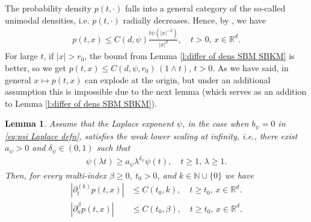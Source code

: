 \documentclass[reqno]{amsart}
\newtheorem{lemma}[theorem]{Lemma}
\theoremstyle{remark}
\numberwithin{equation}{section} %
\newcommand{\1}{\mathds{1}}
\begin{document}
	The probability density $p(t,\cdot)$ falls into a general category of the so-called unimodal densities, i.e. $p(t,\cdot)$ radially decreases. Hence, by \cite[Corollary 7]{bogdan_density_and_tails_unimodal}, we have
	\begin{align}\label{eq:upper bound density p}
		p(t,x)\le C(d,\psi) \frac{t \psi(|x|^{-2})}{|x|^d},\quad t>0,\, x\in \mathbb{R}^d.
	\end{align}
	For large $t$, if $|x|>r_0$, the bound from Lemma \ref{l:differ of dens SBM SBKM} is better, so we get $p(t,x)\le C(d,\psi,r_0)\, (1\wedge t)$, $t>0$.
	As we have said, in general $x\mapsto p(t,x)$ can explode at the origin, but under an additional assumption this is impossible due to the next lemma (which serves as an addition to Lemma \ref{l:differ of dens SBM SBKM}).
	\begin{lemma}\label{l:density in origin}
		Assume that the Laplace exponent  $\psi$, in the case when $b_\psi=0$ in \eqref{eq:psi Laplace defn},  satisfies the weak lower scaling at infinity, i.e., there exist $a_\psi>0$ and $\delta_\psi\in (0,1)$ such that
		\begin{align}\label{eq:LWSC}
			\psi(\lambda t)\ge a_\psi \lambda^{\delta_\psi} \psi(t),\quad t\ge 1, \, \lambda\ge 1.
		\end{align}
		Then, for every multi-index $\beta\ge 0$, $t_0>0$, and $k\in \mathbb{N}\cup\{0\}$ we have
		\begin{align*}
			|\partial^{(k)}_tp(t,x)|&\le C(t_0,k),\quad t\ge t_0,\, x\in \mathbb{R}^d.\\
			|\partial^\beta_x p(t,x)|&\le C(t_0, \beta),\quad t\ge t_0,\, x\in \mathbb{R}^d.
		\end{align*}
	\end{lemma}
\end{document}
